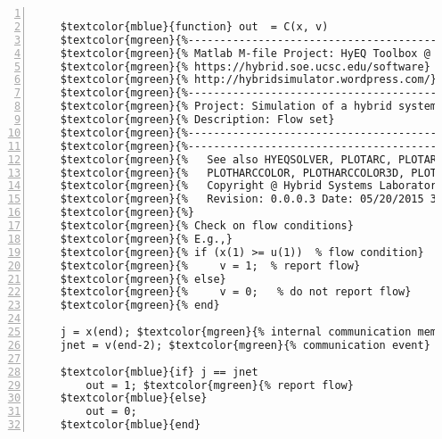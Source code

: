%  
%  
%  
%  
  
  
\DefineShortVerb[fontfamily=courier,fontseries=m]{\$} 
\DefineShortVerb[fontfamily=courier,fontseries=b]{\#} 
  
\begin{Verbatim}[commandchars=\$\{\},numbers=left,numbersep=2pt] 

    $textcolor{mblue}{function} out  = C(x, v)  
    $textcolor{mgreen}{%--------------------------------------------------------------------------} 
    $textcolor{mgreen}{% Matlab M-file Project: HyEQ Toolbox @  Hybrid Systems Laboratory (HSL), } 
    $textcolor{mgreen}{% https://hybrid.soe.ucsc.edu/software} 
    $textcolor{mgreen}{% http://hybridsimulator.wordpress.com/} 
    $textcolor{mgreen}{%--------------------------------------------------------------------------} 
    $textcolor{mgreen}{% Project: Simulation of a hybrid system} 
    $textcolor{mgreen}{% Description: Flow set} 
    $textcolor{mgreen}{%--------------------------------------------------------------------------} 
    $textcolor{mgreen}{%--------------------------------------------------------------------------} 
    $textcolor{mgreen}{%   See also HYEQSOLVER, PLOTARC, PLOTARC3, PLOTFLOWS, PLOTHARC,} 
    $textcolor{mgreen}{%   PLOTHARCCOLOR, PLOTHARCCOLOR3D, PLOTHYBRIDARC, PLOTJUMPS.} 
    $textcolor{mgreen}{%   Copyright @ Hybrid Systems Laboratory (HSL),} 
    $textcolor{mgreen}{%   Revision: 0.0.0.3 Date: 05/20/2015 3:42:00} 
    $textcolor{mgreen}{%} 
    $textcolor{mgreen}{% Check on flow conditions} 
    $textcolor{mgreen}{% E.g.,} 
    $textcolor{mgreen}{% if (x(1) >= u(1))  % flow condition} 
    $textcolor{mgreen}{%     v = 1;  % report flow} 
    $textcolor{mgreen}{% else} 
    $textcolor{mgreen}{%     v = 0;   % do not report flow} 
    $textcolor{mgreen}{% end} 
     
    j = x(end); $textcolor{mgreen}{% internal communication memory event} 
    jnet = v(end-2); $textcolor{mgreen}{% communication event} 
     
    $textcolor{mblue}{if} j == jnet 
        out = 1; $textcolor{mgreen}{% report flow} 
    $textcolor{mblue}{else} 
        out = 0; 
    $textcolor{mblue}{end}  
\end{Verbatim}  
  
\UndefineShortVerb{\$} 
\UndefineShortVerb{\#} 
 